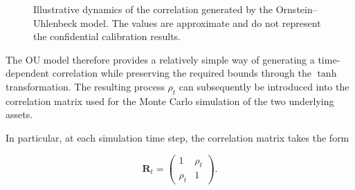 \documentclass{article}
\begin{document}
\begin{figure}[H]
    \centering

    \caption{
        Illustrative dynamics of the correlation generated by the
        Ornstein--Uhlenbeck model. The values are approximate and do
        not represent the confidential calibration results.
    }
    \label{fig:ou_correlation}
\end{figure}


The OU model therefore provides a relatively simple way of generating
a time-dependent correlation while preserving the required bounds
through the $\tanh$ transformation. The resulting process $\rho_t$
can subsequently be introduced into the correlation matrix used for
the Monte Carlo simulation of the two underlying assets.

In particular, at each simulation time step, the correlation matrix
takes the form

\begin{equation}
\mathbf{R}_t
=
\begin{pmatrix}
1 & \rho_t\\
\rho_t & 1
\end{pmatrix}.
\end{equation}
\end{document}

